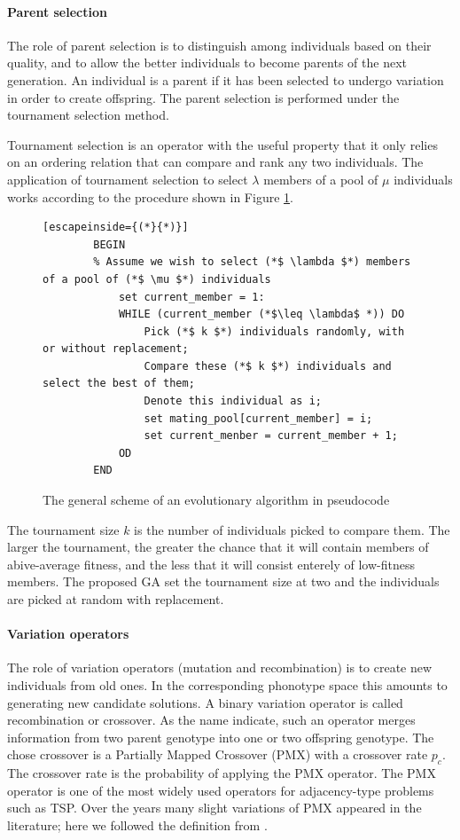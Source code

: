 \documentclass[10pt,a4paper]{article}
\begin{document}
\paragraph*{Parent selection}
The role of parent selection is to distinguish among individuals based on their quality, and to allow the better individuals to become parents of the next generation. An individual is a parent if it has been selected to undergo variation in order to create offspring. The parent selection is performed under the tournament selection method. 

Tournament selection is an operator with the useful property that it only relies on an ordering relation that can compare and rank any two individuals. The application of tournament selection to select $\lambda$ members of a pool of $\mu$ individuals works according to the procedure shown in Figure \ref{fig:tournament}.
\begin{figure}[h!]
    \centering
    \begin{lstlisting}[escapeinside={(*}{*)}]
        BEGIN
        % Assume we wish to select (*$ \lambda $*) members of a pool of (*$ \mu $*) individuals
            set current_member = 1:
            WHILE (current_member (*$\leq \lambda$ *)) DO
                Pick (*$ k $*) individuals randomly, with or without replacement;
                Compare these (*$ k $*) individuals and select the best of them;
                Denote this individual as i;
                set mating_pool[current_member] = i;
                set current_menber = current_member + 1;
            OD 
        END
    \end{lstlisting}
    \label{fig:tournament}
\caption{The general scheme of an evolutionary algorithm in pseudocode}
\end{figure}

The tournament size $k$ is the number of individuals picked to compare them. The larger the tournament, the greater the chance that it will contain members of abive-average fitness, and the less that it will consist enterely of low-fitness members. The proposed GA set the tournament size at two and the individuals are picked at random with replacement.

\paragraph*{Variation operators}
The role of variation operators (mutation and recombination) is to create new individuals from old ones. In the corresponding phonotype space this amounts to generating new candidate solutions. A binary variation operator is called recombination or crossover. As the name indicate, such an operator merges information from two parent genotype into one or two offspring genotype. The chose crossover is a Partially Mapped Crossover (PMX) with a crossover rate $p_c$. The crossover rate is the probability of applying the PMX operator. The PMX operator is one of the most widely used operators for adjacency-type problems such as TSP. Over the years many slight variations of PMX appeared in the literature; here we followed the definition from \textcite{IntroEvComp}.
\end{document}
